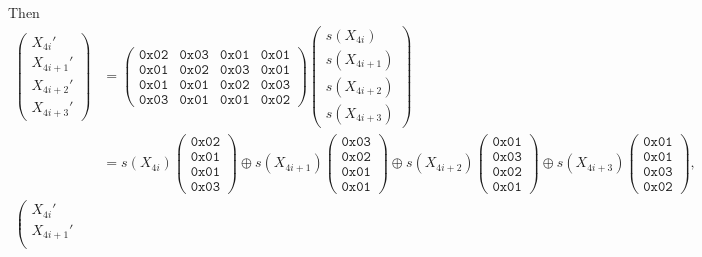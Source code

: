 Then \begin{align*}
\left(\begin{array}{l}
	X_{4i}' \\
	X_{4i+1}' \\
	X_{4i+2}' \\
	X_{4i+3}'
\end{array}\right)&=\begin{pmatrix}
	\texttt{0x02} & \texttt{0x03} & \texttt{0x01} & \texttt{0x01}\\
	\texttt{0x01} & \texttt{0x02} & \texttt{0x03} & \texttt{0x01}\\
	\texttt{0x01} & \texttt{0x01} & \texttt{0x02} & \texttt{0x03}\\
	\texttt{0x03} & \texttt{0x01} & \texttt{0x01} & \texttt{0x02}
\end{pmatrix}\left(\begin{array}{l}
s(X_{4i})\\
s(X_{4i+1})\\
s(X_{4i+2})\\
s(X_{4i+3})
\end{array}\right)\\
&=s(X_{4i})\begin{pmatrix}
	\texttt{0x02}\\
	\texttt{0x01}\\
	\texttt{0x01}\\
	\texttt{0x03}
\end{pmatrix}\oplus s(X_{4i+1})\begin{pmatrix}
\texttt{0x03}\\
\texttt{0x02}\\
\texttt{0x01}\\
\texttt{0x01}
\end{pmatrix}\oplus s(X_{4i+2})\begin{pmatrix}
\texttt{0x01}\\
\texttt{0x03}\\
\texttt{0x02}\\
\texttt{0x01}
\end{pmatrix}\oplus s(X_{4i+3})\begin{pmatrix}
\texttt{0x01}\\
\texttt{0x01}\\
\texttt{0x03}\\
\texttt{0x02}
\end{pmatrix},\\
\left(\begin{array}{l}
	X_{4i}' \\
	X_{4i+1}' \\

\end{array}
\end{align*}
